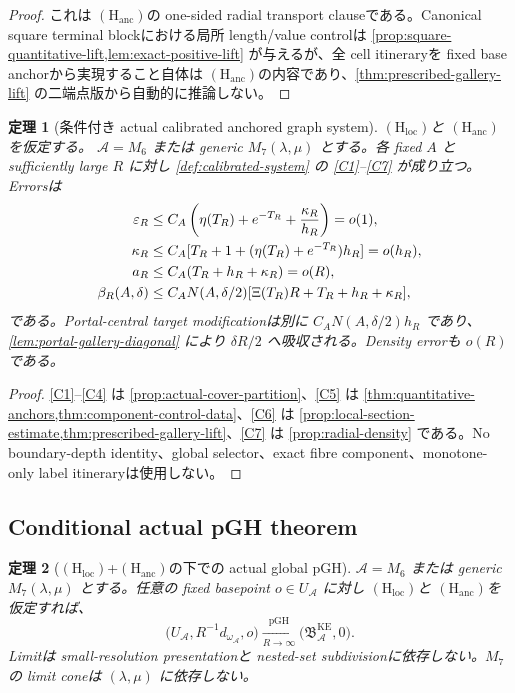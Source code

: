 \documentclass[11pt,a4paper]{ltjsarticle}
\newcommand{\cA}{\mathcal A}\newcommand{\cB}{\mathcal B}\newcommand{\cC}{\mathcal C}
\newcommand{\BKE}{\mathfrak B_{\cA}^{\mathrm{KE}}}
\newcommand{\Hloc}{\ensuremath{(\mathrm H_{\mathrm{loc}})}}
\newcommand{\Hanc}{\ensuremath{(\mathrm H_{\mathrm{anc}})}}
\theoremstyle{plain}
\newtheorem{theorem}{定理}[section]\newtheorem{proposition}[theorem]{命題}
\theoremstyle{definition}
\theoremstyle{remark}
\begin{document}
\begin{proof}
これは \Hanc の one-sided radial transport clauseである。Canonical square terminal blockにおける局所 length/value controlは \cref{prop:square-quantitative-lift,lem:exact-positive-lift} が与えるが、全 cell itineraryを fixed base anchorから実現すること自体は \Hanc の内容であり、\cref{thm:prescribed-gallery-lift} の二端点版から自動的に推論しない。
\end{proof}

\begin{theorem}[条件付き actual calibrated anchored graph system]\label{thm:verified-portal-system}
\Hloc と \Hanc を仮定する。
$\cA=M_6$ または generic $M_7(\lambda,\mu)$ とする。各 fixed $A$ と sufficiently large $R$ に対し \cref{def:calibrated-system} の \ref{C1}--\ref{C7} が成り立つ。Errorsは
\begin{align*}
 \varepsilon_R&\le C_A\left(\eta(T_R)+e^{-T_R}+\frac{\kappa_R}{h_R}\right)=o(1),\\
 \kappa_R&\le C_A[T_R+1+(\eta(T_R)+e^{-T_R})h_R]=o(h_R),\\
 a_R&\le C_A(T_R+h_R+\kappa_R)=o(R),\\
 \beta_R(A,\delta)&\le C_AN(A,\delta/2)
 [\Xi(T_R)R+T_R+h_R+\kappa_R],
\end{align*}
である。Portal-central target modificationは別に $C_AN(A,\delta/2)h_R$ であり、\cref{lem:portal-gallery-diagonal} により $\delta R/2$ へ吸収される。Density errorも $o(R)$ である。
\end{theorem}

\begin{proof}
\ref{C1}--\ref{C4} は \cref{prop:actual-cover-partition}、\ref{C5} は \cref{thm:quantitative-anchors,thm:component-control-data}、\ref{C6} は \cref{prop:local-section-estimate,thm:prescribed-gallery-lift}、\ref{C7} は \cref{prop:radial-density} である。No boundary-depth identity、global selector、exact fibre component、monotone-only label itineraryは使用しない。
\end{proof}

\subsection{Conditional actual pGH theorem}
\begin{theorem}[\Hloc+\Hanc の下での actual global pGH]\label{thm:actual-global-pgh}
$\cA=M_6$ または generic $M_7(\lambda,\mu)$ とする。任意の fixed basepoint $o\in U_{\cA}$ に対し
\Hloc と \Hanc を仮定すれば、
\[
 \bigl(U_{\cA},R^{-1}d_{\omega_{\cA}},o\bigr)
 \xrightarrow[R\to\infty]{\mathrm{pGH}}
 \bigl(\BKE,0\bigr).
\]
Limitは small-resolution presentationと nested-set subdivisionに依存しない。$M_7$ の limit coneは $(\lambda,\mu)$ に依存しない。
\end{theorem}
\end{document}
